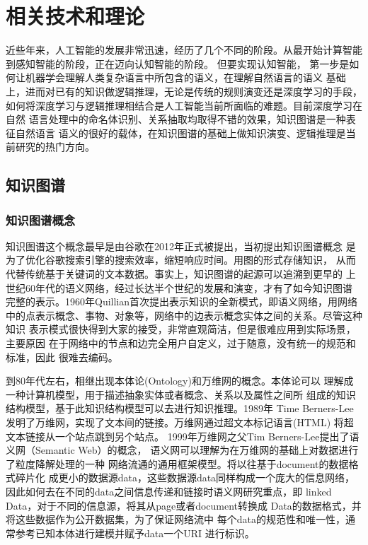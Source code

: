 \documentclass{standalone}
\begin{document}
\chapter{相关技术和理论}
近些年来，人工智能的发展非常迅速，经历了几个不同的阶段。从最开始计算智能
到感知智能的阶段，正在迈向认知智能的阶段。
但要实现认知智能，
第一步是如何让机器学会理解人类复杂语言中所包含的语义，在理解自然语言的语义
基础上，进而对已有的知识做逻辑推理，无论是传统的规则演变还是深度学习的手段，
如何将深度学习与逻辑推理相结合是人工智能当前所面临的难题。目前深度学习在自然
语言处理中的命名体识别、关系抽取均取得不错的效果，知识图谱是一种表征自然语言
语义的很好的载体，在知识图谱的基础上做知识演变、逻辑推理是当前研究的热门方向。
\section{知识图谱}
\subsection{知识图谱概念}
知识图谱这个概念最早是由谷歌在2012年正式被提出，当初提出知识图谱概念
是为了优化谷歌搜索引擎的搜索效率，缩短响应时间。用图的形式存储知识，
从而代替传统基于关键词的文本数据。事实上，知识图谱的起源可以追溯到更早的
上世纪60年代的语义网络，经过长达半个世纪的发展和演变，才有了如今知识图谱
完整的表示。1960年Quillian首次提出表示知识的全新模式，即语义网络，用网络
中的点表示概念、事物、对象等，网络中的边表示概念实体之间的关系。尽管这种知识
表示模式很快得到大家的接受，非常直观简洁，但是很难应用到实际场景，主要原因
在于网络中的节点和边完全用户自定义，过于随意，没有统一的规范和标准，因此
很难去编码。

到80年代左右，相继出现本体论(Ontology)和万维网的概念。本体论可以
理解成一种计算机模型，用于描述抽象实体或者概念、关系以及属性之间所
组成的知识结构模型，基于此知识结构模型可以去进行知识推理。1989年
Time Berners-Lee发明了万维网，实现了文本间的链接。万维网通过超文本标记语言(HTML)
将超文本链接从一个站点跳到另个站点。
1999年万维网之父Tim Berners-Lee提出了语义网（Semantic Web）的概念，
语义网可以理解为在万维网的基础上对数据进行了粒度降解处理的一种
网络流通的通用框架模型。将以往基于document的数据格式碎片化
成更小的数据源data，这些数据源data同样构成一个庞大的信息网络，
因此如何去在不同的data之间信息传递和链接时语义网研究重点，即
linked Data，对于不同的信息源，将其从page或者document转换成
Data的数据格式，并将这些数据作为公开数据集，为了保证网络流中
每个data的规范性和唯一性，通常参考已知本体进行建模并赋予data一个URI
进行标识。
\end{document}
